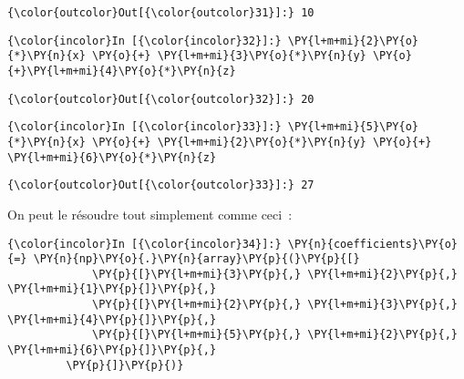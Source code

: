 \begin{Verbatim}[commandchars=\\\{\},frame=single,framerule=0.3mm,rulecolor=\color{cellframecolor}]
{\color{outcolor}Out[{\color{outcolor}31}]:} 10
\end{Verbatim}
            
    \begin{Verbatim}[commandchars=\\\{\},frame=single,framerule=0.3mm,rulecolor=\color{cellframecolor}]
{\color{incolor}In [{\color{incolor}32}]:} \PY{l+m+mi}{2}\PY{o}{*}\PY{n}{x} \PY{o}{+} \PY{l+m+mi}{3}\PY{o}{*}\PY{n}{y} \PY{o}{+}\PY{l+m+mi}{4}\PY{o}{*}\PY{n}{z}
\end{Verbatim}


\begin{Verbatim}[commandchars=\\\{\},frame=single,framerule=0.3mm,rulecolor=\color{cellframecolor}]
{\color{outcolor}Out[{\color{outcolor}32}]:} 20
\end{Verbatim}
            
    \begin{Verbatim}[commandchars=\\\{\},frame=single,framerule=0.3mm,rulecolor=\color{cellframecolor}]
{\color{incolor}In [{\color{incolor}33}]:} \PY{l+m+mi}{5}\PY{o}{*}\PY{n}{x} \PY{o}{+} \PY{l+m+mi}{2}\PY{o}{*}\PY{n}{y} \PY{o}{+} \PY{l+m+mi}{6}\PY{o}{*}\PY{n}{z}
\end{Verbatim}


\begin{Verbatim}[commandchars=\\\{\},frame=single,framerule=0.3mm,rulecolor=\color{cellframecolor}]
{\color{outcolor}Out[{\color{outcolor}33}]:} 27
\end{Verbatim}
            
    On peut le résoudre tout simplement comme ceci~:

    \begin{Verbatim}[commandchars=\\\{\},frame=single,framerule=0.3mm,rulecolor=\color{cellframecolor}]
{\color{incolor}In [{\color{incolor}34}]:} \PY{n}{coefficients}\PY{o}{=} \PY{n}{np}\PY{o}{.}\PY{n}{array}\PY{p}{(}\PY{p}{[}
             \PY{p}{[}\PY{l+m+mi}{3}\PY{p}{,} \PY{l+m+mi}{2}\PY{p}{,} \PY{l+m+mi}{1}\PY{p}{]}\PY{p}{,}
             \PY{p}{[}\PY{l+m+mi}{2}\PY{p}{,} \PY{l+m+mi}{3}\PY{p}{,} \PY{l+m+mi}{4}\PY{p}{]}\PY{p}{,}
             \PY{p}{[}\PY{l+m+mi}{5}\PY{p}{,} \PY{l+m+mi}{2}\PY{p}{,} \PY{l+m+mi}{6}\PY{p}{]}\PY{p}{,}
         \PY{p}{]}\PY{p}{)}
\end{Verbatim}


